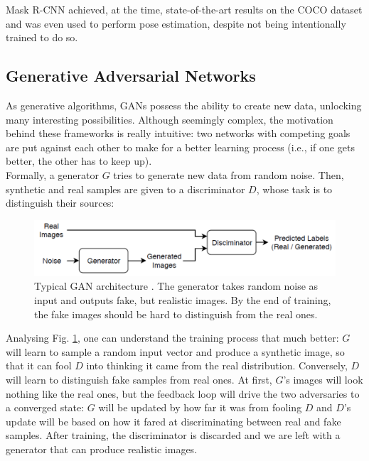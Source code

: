Mask \ac{R-CNN} achieved, at the time, state-of-the-art results on the \ac{COCO} dataset and was even used to perform pose estimation, despite not being intentionally trained to do so.

\subsection{Generative Adversarial Networks}
\label{subsec:chap2_gan}

As generative algorithms, \ac{GAN}s possess the ability to create new data, unlocking many interesting possibilities. Although seemingly complex, the motivation behind these frameworks is really intuitive: two networks with competing goals are put against each other to make for a better learning process (i.e., if one gets better, the other has to keep up).\\

Formally, a generator $G$ tries to generate new data from random noise. Then, synthetic and real samples are given to a discriminator $D$, whose task is to distinguish their sources:

\begin{figure}[h]
\centering
\includegraphics[width=360pt]{figures/figure_10.pdf}
\caption{Typical \ac{GAN} architecture \cite{gan_architecture}. The generator takes random noise as input and outputs fake, but realistic images. By the end of training, the fake images should be hard to distinguish from the real ones.}
\label{fig:gan}
\end{figure}

Analysing Fig. \ref{fig:gan}, one can understand the training process that much better: $G$ will learn to sample a random input vector and produce a synthetic image, so that it can fool $D$ into thinking it came from the real distribution. Conversely, $D$ will learn to distinguish fake samples from real ones. At first, $G$'s images will look nothing like the real ones, but the feedback loop will drive the two adversaries to a converged state: $G$ will be updated by how far it was from fooling $D$ and $D$'s update will be based on how it fared at discriminating between real and fake samples. After training, the discriminator is discarded and we are left with a generator that can produce realistic images.\\

